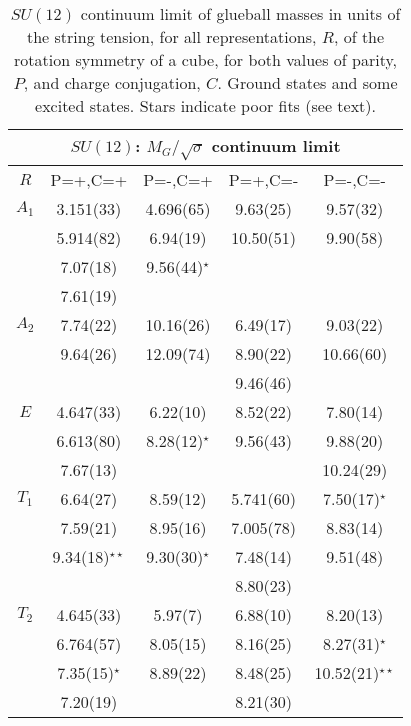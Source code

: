 \documentclass[12pt]{article}
\begin{document}
\begin{table}[htb]
\centering
\begin{tabular}{|c|c|c|c|c|} \hline
\multicolumn{5}{|c|}{$SU(12)$: $M_G/\surd\sigma$  continuum limit} \\ \hline
  $R$   & P=+,C=+ & P=-,C=+ &  P=+,C=-   &  P=-,C=-   \\ \hline
$A_1$  & 3.151(33)  & 4.696(65) & 9.63(25)   & 9.57(32)  \\
    & 5.914(82)  & 6.94(19)  & 10.50(51)  & 9.90(58)  \\
    & 7.07(18)   & 9.56(44)$^\star$ &      &           \\
    & 7.61(19)   &           &            &          \\ \hline
$A_2$  & 7.74(22)   & 10.16(26) & 6.49(17)   & 9.03(22)  \\
    & 9.64(26)   & 12.09(74) & 8.90(22)   & 10.66(60)  \\
    &            &           & 9.46(46)   &   \\ \hline
$E$   & 4.647(33)  & 6.22(10)  & 8.52(22)   & 7.80(14)  \\
    & 6.613(80)  & 8.28(12)$^\star$ & 9.56(43) & 9.88(20) \\
    & 7.67(13)   &           &            & 10.24(29)    \\ \hline
$T_1$  & 6.64(27)   & 8.59(12)  & 5.741(60)  & 7.50(17)$^\star$  \\
    & 7.59(21)   & 8.95(16)  & 7.005(78)  & 8.83(14)     \\
    & 9.34(18)$^{\star\star}$ & 9.30(30)$^\star$ & 7.48(14) & 9.51(48)  \\
    &            &           & 8.80(23)   &   \\ \hline
$T_2$  & 4.645(33)  & 5.97(7)   & 6.88(10) &  8.20(13)      \\
    & 6.764(57)  & 8.05(15)  & 8.16(25) &  8.27(31)$^\star$ \\
    & 7.35(15)$^\star$ & 8.89(22) & 8.48(25) & 10.52(21)$^{\star\star}$  \\
    & 7.20(19)   &           & 8.21(30) &                \\ \hline
\end{tabular}
\caption{$SU(12)$ continuum limit of glueball masses in units of the string tension,
  for all representations, $R$, of the rotation symmetry of a cube, for
  both values of parity, $P$, and charge conjugation, $C$.
  Ground states and some excited states. Stars
  indicate poor fits (see text).}
\label{table_MK_R_SU12}
\end{table}
\end{document}
